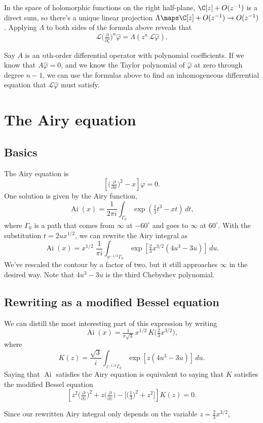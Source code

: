 \documentclass{article}
\theoremstyle{definition}
\theoremstyle{plain}
\newcommand{\laplace}{\mathcal{L}}
\DeclareMathOperator{\Ai}{Ai}
\begin{document}
In the space of holomorphic functions on the right half-plane, $\C[z] + O(z^{-1})$ is a direct sum, so there's a unique linear projection $\Lambda \maps \C[z] + O(z^{-1}) \to O(z^{-1})$. Applying $\Lambda$ to both sides of the formula above reveals that
\[ \laplace \big(\tfrac{\partial}{\partial \zeta}\big)^n \hat{\varphi} = \Lambda (z^n\,\laplace \hat{\varphi}). \]

Say $A$ is an $n$th-order differential operator with polynomial coefficients. If we know that $A\hat{\varphi} = 0$, and we know the Taylor polynomial of $\hat{\varphi}$ at zero through degree $n - 1$, we can use the formulas above to find an inhomogeneous differential equation that $\laplace \hat{\varphi}$ must satisfy.
\section{The Airy equation}
\subsection{Basics}
The Airy equation is
\[ \left[\big(\tfrac{\partial}{\partial x}\big)^2 - x\right] \varphi = 0. \]
One solution is given by the Airy function,
\[ \Ai(x) = \frac{1}{2\pi i} \int_{\Gamma_0} \exp\left(\tfrac{1}{3}t^3 - xt\right)\,dt, \]
where $\Gamma_0$ is a path that comes from $\infty$ at $-60^\circ$ and goes to $\infty$ at $60^\circ$. With the substitution $t = 2ux^{1/2}$, we can rewrite the Airy integral as
\[ \Ai(x) = x^{1/2}\;\frac{1}{\pi i} \int_{x^{-1/2} \Gamma_0} \exp\left[\tfrac{2}{3}x^{3/2} \left(4u^3 - 3u\right)\right]\,du. \]
We've rescaled the contour by a factor of two, but it still approaches $\infty$ in the desired way. Note that $4u^3 - 3u$ is the third Chebyshev polynomial.
\subsection{Rewriting as a modified Bessel equation}
We can distill the most interesting part of this expression by writing
\[ \Ai(x) = \tfrac{1}{\pi\sqrt{3}}\,x^{1/2}\, K\big(\tfrac{2}{3} x^{3/2}\big), \]
where
\[ K(z) = \frac{\sqrt{3}}{i} \int_{z^{-1/3}\Gamma_0} \exp\left[z \left(4u^3 - 3u\right)\right]\,du. \]
Saying that $\Ai$ satisfies the Airy equation is equivalent to saying that $K$ satisfies the modified Bessel equation
\[ \left[z^2 \big(\tfrac{\partial}{\partial z}\big)^2 + z \big(\tfrac{\partial}{\partial z}\big) - \big[\big(\tfrac{1}{3}\big)^2 + z^2\big]\right] K(z) = 0. \]

Since our rewritten Airy integral only depends on the variable $z = \tfrac{2}{3} x^{3/2}$,
\end{document}
